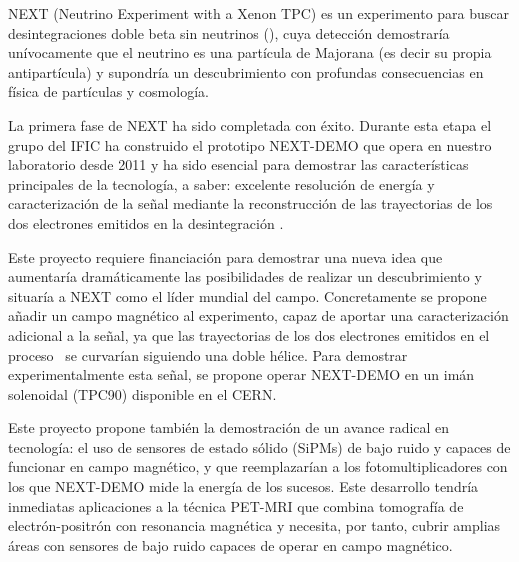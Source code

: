 
NEXT (Neutrino Experiment with a Xenon TPC) es un experimento para buscar desintegraciones doble beta sin neutrinos (\bbonu), cuya detección demostraría unívocamente que el neutrino es una partícula de Majorana (es decir su propia antipartícula) y supondría un descubrimiento con profundas consecuencias en física de partículas y cosmología. 

La primera fase de NEXT ha sido completada con éxito. Durante esta etapa el grupo del IFIC ha construido el prototipo NEXT-DEMO que opera en nuestro laboratorio desde 2011 y ha sido esencial para  demostrar las características principales de la tecnología, a saber: excelente resolución de energía y caracterización de la señal mediante la reconstrucción de las trayectorias de los dos electrones emitidos en la desintegración \bbonu. 

Este  proyecto requiere financiación para demostrar una nueva idea que aumentaría dramáticamente las posibilidades de realizar un descubrimiento y situaría a NEXT como el líder mundial del campo. Concretamente se propone añadir un campo magnético al experimento, capaz de aportar una caracterización adicional a la señal, ya que las trayectorias de los dos electrones emitidos en el proceso \bbonu\ se curvarían siguiendo una doble hélice. Para demostrar experimentalmente esta señal, se propone operar NEXT-DEMO en un imán solenoidal (TPC90) disponible en el CERN.

Este proyecto propone también la demostración de un avance radical en tecnología: el uso de sensores de estado sólido (SiPMs) de bajo ruido y capaces de funcionar en campo magnético, y que reemplazarían a los fotomultiplicadores con los que NEXT-DEMO mide la energía de los sucesos. Este desarrollo tendría inmediatas aplicaciones a la técnica PET-MRI que combina tomografía de electrón-positrón con resonancia magnética y necesita, por tanto, cubrir amplias áreas con sensores de bajo ruido capaces de operar en campo magnético.   

